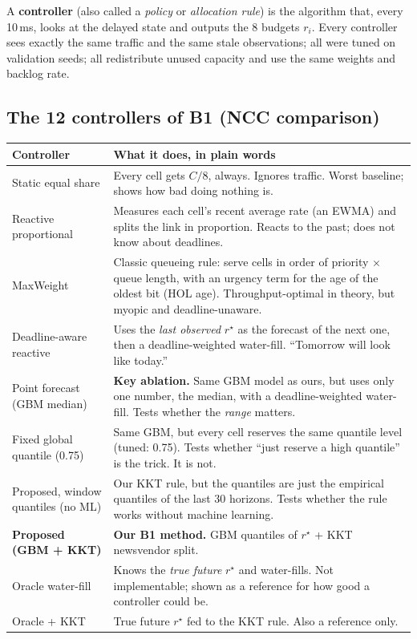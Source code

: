 \documentclass[11pt,a4paper]{article}
\newcommand{\rstar}{r^\star}
\begin{document}
A \textbf{controller} (also called a \emph{policy} or \emph{allocation rule}) is the algorithm that, every 10\,ms, looks at the delayed state and outputs the 8 budgets $r_i$. Every controller sees exactly the same traffic and the same stale observations; all were tuned on validation seeds; all redistribute unused capacity and use the same weights and backlog rate.

\subsection{The 12 controllers of B1 (NCC comparison)}

\begin{center}
\small
\renewcommand{\arraystretch}{1.2}
\begin{tabularx}{\linewidth}{>{\raggedright\arraybackslash}p{3.6cm}X}
\toprule
Controller & What it does, in plain words \\
\midrule
Static equal share & Every cell gets $C/8$, always. Ignores traffic. Worst baseline; shows how bad doing nothing is. \\
Reactive proportional & Measures each cell's recent average rate (an EWMA) and splits the link in proportion. Reacts to the past; does not know about deadlines. \\
MaxWeight & Classic queueing rule: serve cells in order of priority $\times$ queue length, with an urgency term for the age of the oldest bit (HOL age). Throughput-optimal in theory, but myopic and deadline-unaware. \\
Deadline-aware reactive & Uses the \emph{last observed} $\rstar$ as the forecast of the next one, then a deadline-weighted water-fill. ``Tomorrow will look like today.'' \\
Point forecast (GBM median) & \textbf{Key ablation.} Same GBM model as ours, but uses only one number, the median, with a deadline-weighted water-fill. Tests whether the \emph{range} matters. \\
Fixed global quantile (0.75) & Same GBM, but every cell reserves the same quantile level (tuned: 0.75). Tests whether ``just reserve a high quantile'' is the trick. It is not. \\
Proposed, window quantiles (no ML) & Our KKT rule, but the quantiles are just the empirical quantiles of the last 30 horizons. Tests whether the rule works without machine learning. \\
\textbf{Proposed (GBM + KKT)} & \textbf{Our B1 method.} GBM quantiles of $\rstar$ + KKT newsvendor split. \\
Oracle water-fill & Knows the \emph{true future} $\rstar$ and water-fills. Not implementable; shown as a reference for how good a controller could be. \\
Oracle + KKT & True future $\rstar$ fed to the KKT rule. Also a reference only. \\
\bottomrule
\end{tabularx}
\end{center}
\end{document}
